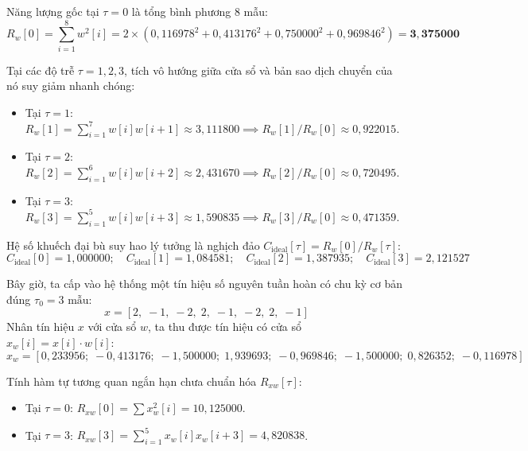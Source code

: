 Năng lượng gốc tại $\tau = 0$ là tổng bình phương 8 mẫu:
\begin{equation}
R_w[0] = \sum_{i=1}^8 w^2[i] = 2 \times (0{,}116978^2 + 0{,}413176^2 + 0{,}750000^2 + 0{,}969846^2) = \mathbf{3{,}375000}
\end{equation}

Tại các độ trễ $\tau = 1, 2, 3$, tích vô hướng giữa cửa sổ và bản sao dịch chuyển của nó suy giảm nhanh chóng:
\begin{itemize}[leftmargin=1.5em, itemsep=2pt]
    \item Tại $\tau = 1$: $R_w[1] = \sum_{i=1}^7 w[i] w[i+1] \approx 3{,}111800 \implies R_w[1]/R_w[0] \approx 0{,}922015$.
    \item Tại $\tau = 2$: $R_w[2] = \sum_{i=1}^6 w[i] w[i+2] \approx 2{,}431670 \implies R_w[2]/R_w[0] \approx 0{,}720495$.
    \item Tại $\tau = 3$: $R_w[3] = \sum_{i=1}^5 w[i] w[i+3] \approx 1{,}590835 \implies R_w[3]/R_w[0] \approx 0{,}471359$.
\end{itemize}

Hệ số khuếch đại bù suy hao lý tưởng là nghịch đảo $C_{\text{ideal}}[\tau] = R_w[0] / R_w[\tau]$:
\begin{equation}
C_{\text{ideal}}[0] = 1{,}000000; \quad C_{\text{ideal}}[1] = 1{,}084581; \quad C_{\text{ideal}}[2] = 1{,}387935; \quad C_{\text{ideal}}[3] = 2{,}121527
\end{equation}

Bây giờ, ta cấp vào hệ thống một tín hiệu số nguyên tuần hoàn có chu kỳ cơ bản đúng $\tau_0 = 3\text{ mẫu}$:
\begin{equation}
x = [2,\; -1,\; -2,\; 2,\; -1,\; -2,\; 2,\; -1]
\end{equation}
Nhân tín hiệu $x$ với cửa sổ $w$, ta thu được tín hiệu có cửa sổ $x_w[i] = x[i] \cdot w[i]$:
\begin{equation}
x_w = [0{,}233956;\; -0{,}413176;\; -1{,}500000;\; 1{,}939693;\; -0{,}969846;\; -1{,}500000;\; 0{,}826352;\; -0{,}116978]
\end{equation}

Tính hàm tự tương quan ngắn hạn chưa chuẩn hóa $R_{xw}[\tau]$:
\begin{itemize}[leftmargin=1.5em, itemsep=2pt]
    \item Tại $\tau = 0$: $R_{xw}[0] = \sum x_w^2[i] = 10{,}125000$.
    \item Tại $\tau = 3$: $R_{xw}[3] = \sum_{i=1}^5 x_w[i] x_w[i+3] = 4{,}820838$.
\end{itemize}

